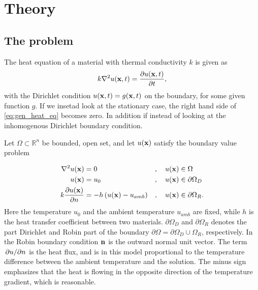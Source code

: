 \section{Theory}
\subsection{The problem}
The heat equation of a material with thermal conductivity $k$ is given as
\begin{equation}
	k\laplacian{u(\vb{x},t)} = \pdv{u(\vb{x},t)}{t}
	\label{eq:gen_heat_eq},
\end{equation}
with the Dirichlet condition $u(\vb{x},t) = g(\vb{x},t)$ on the boundary, for some given function $g$. If we insetad look at the stationary case, the right hand side of \eqref{eq:gen_heat_eq} becomes zero. In addition if instead of looking at the inhomogenous Dirichlet boundary condition.

Let $\Omega \subset \mathbb{R}^n$ be bounded, open set, and let $u(\vb{x})$ satisfy the boundary value problem 

\begin{alignat}{3}
	\laplacian{u(\vb{x})} &= 0 &&,\quad u(\vb{x}) \in \Omega \\
	u(\vb{x}) &= u_0 &&,\quad u(\vb{x}) \in \partial\Omega_D \\
	k\pdv{u(\vb{x})}{n} &= -h\left(u(\vb{x}) - u_{amb} \right) &&, \quad u(\vb{x}) \in \partial\Omega_R.
	\label{eq:heat_bvp}
\end{alignat}
Here the temperature $u_0$ and the ambient temperature $u_{amb}$ are fixed, while $h$ is the heat transfer coefficient between two materials. $\partial\Omega_D$ and $\partial\Omega_R$ denotes the part Dirichlet and Robin part of the boundary $\partial\Omega = \partial\Omega_D\cup\Omega_R$, respectively. In the Robin boundary condition  $\vb{n}$ is the outward normal unit vector. The term $\pdv*{u}{n}$ is the heat flux, and is in this model proportional to the temperature difference between the ambient temperature and the solution. The minus sign emphasizes that the heat is flowing in the opposite direction of the temperature gradient, which is reasonable.

